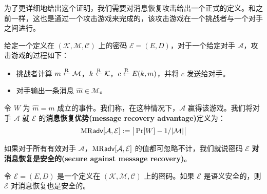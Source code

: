 为了更详细地给出这个证明，我们需要对消息恢复攻击给出一个正式的定义。和之前一样，这也是通过一个攻击游戏来完成的，该攻击游戏在一个挑战者与一个对手之间进行。

\begin{game}[消息恢复]\label{game:2-2}
给定一个定义在 $(\mathcal{K},\mathcal{M},\mathcal{C})$ 上的密码 $\mathcal{E}=(E,D)$，对于一个给定对手 $\mathcal{A}$，攻击游戏的过程如下：
\begin{itemize}
	\item 挑战者计算 $m\overset{\rm R}\leftarrow\mathcal{M}$，$k\overset{\rm R}\leftarrow\mathcal{K}$，$c\overset{\rm R}\leftarrow E(k,m)$，并将 $c$ 发送给对手。
	\item 对手输出一条消息 $\hat m\in\mathcal{M}$。
\end{itemize}
令 $W$ 为 $\hat m=m$ 成立的事件。我们称，在这种情况下，$\mathcal{A}$ 赢得该游戏。我们将对手 $\mathcal{A}$ 就 $\mathcal{E}$ 的\textbf{消息恢复优势(message recovery advantage)}定义为：
\[
{\rm MR\mathsf{adv}}[\mathcal{A},\mathcal{E}]:=
\big\lvert
\Pr[W] -1/|\mathcal{M}|
\big\rvert
\]
\end{game}

\begin{definition}[针对消息恢复的安全性]\label{def:2-3}
如果对于所有有效对手 $\mathcal{A}$，${\rm MR\mathsf{adv}}[\mathcal{A},\mathcal{E}]$ 的值都可忽略不计，我们就说密码 $\mathcal{E}$ \textbf{对消息恢复是安全的(secure against message recovery)}。
\end{definition}

\begin{theorem}\label{theo:2-7}
令 $\mathcal{E}=(E,D)$ 是一个定义在 $(\mathcal{K},\mathcal{M},\mathcal{C})$ 上的密码。如果 $\mathcal{E}$ 是语义安全的，则 $\mathcal{E}$ 对消息恢复也是安全的。
\end{theorem}

